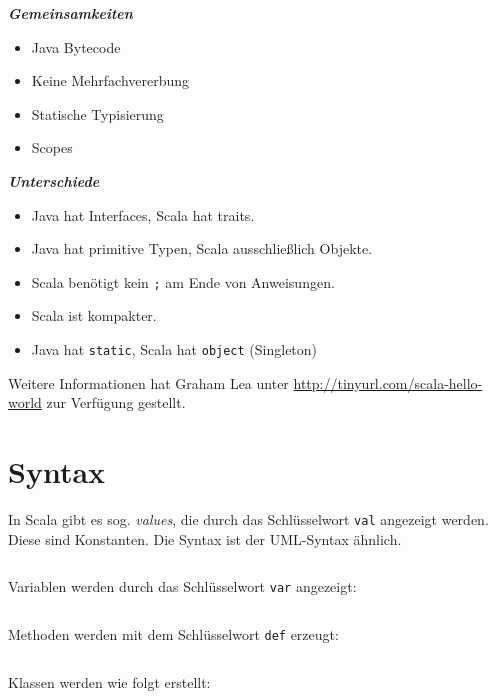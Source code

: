 \noindent\parbox[t]{2.4in}{\raggedright%
\textbf{\textit{Gemeinsamkeiten}}
\begin{itemize}[topsep=0pt,itemsep=-2pt,leftmargin=13pt]
    \item Java Bytecode
    \item Keine Mehrfachvererbung
    \item Statische Typisierung
    \item Scopes
\end{itemize}
}%
\parbox[t]{2.4in}{\raggedright%
\textbf{\textit{Unterschiede}}
\begin{itemize}[topsep=0pt,itemsep=-2pt,leftmargin=13pt]
    \item Java hat Interfaces, Scala hat traits.
    \item Java hat primitive Typen, Scala ausschließlich Objekte.
    \item Scala benötigt kein \texttt{;} am Ende von Anweisungen.
    \item Scala ist kompakter.
    \item Java hat \texttt{static}, Scala hat \texttt{object} (Singleton)
\end{itemize}
}

Weitere Informationen hat Graham Lea unter \url{http://tinyurl.com/scala-hello-world} zur Verfügung gestellt.

\section{Syntax}
In Scala gibt es sog. \textit{values}, die durch das Schlüsselwort \texttt{val}
angezeigt werden. Diese sind Konstanten. Die Syntax ist der UML-Syntax ähnlich.

\inputminted[numbersep=5pt, tabsize=4]{scala}{scripts/scala/val-syntax.scala}

Variablen werden durch das Schlüsselwort \texttt{var} angezeigt:

\inputminted[numbersep=5pt, tabsize=4]{scala}{scripts/scala/var-syntax.scala}

Methoden werden mit dem Schlüsselwort \texttt{def} erzeugt:

\inputminted[numbersep=5pt, tabsize=4]{scala}{scripts/scala/method-syntax.scala}

Klassen werden wie folgt erstellt:
\inputminted[numbersep=5pt, tabsize=4]{scala}{scripts/scala/simple-class-example.scala}


